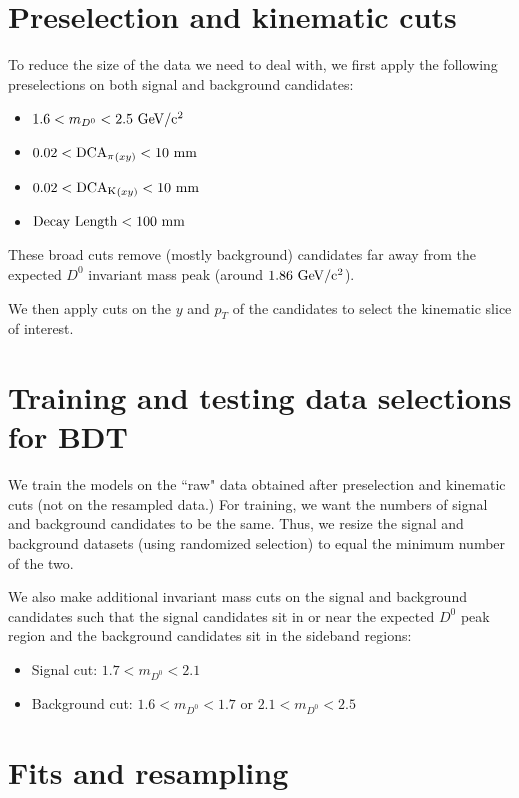 \section{Preselection and kinematic cuts}
\label{app.presel}
To reduce the size of the data we need to deal with, we first apply the following preselections on both signal and background candidates:
\begin{itemize}
    \item $1.6 < m_{D^0} < 2.5 ~{\rm GeV/c^2}$
    \item $0.02 < {\rm DCA_\pi}_{(xy)} < 10 ~{\rm mm}$
    \item $0.02 < {\rm DCA_K}_{(xy)} < 10 ~{\rm mm}$
    \item ${\rm Decay~Length} < 100 ~ {\rm mm}$
\end{itemize}
These broad cuts remove (mostly background) candidates far away from the expected $D^0$ invariant mass peak (around $1.86~{\rm GeV/c^2}$).

We then apply cuts on the $y$ and $p_T$ of the candidates to select the kinematic slice of interest.

\section{Training and testing data selections for BDT}
\label{app.presel}
We train the models on the ``raw" data obtained after preselection and kinematic cuts (not on the resampled data.) For training, we want the numbers of signal and background candidates to be the same. Thus, we resize the signal and background datasets (using randomized selection) to equal the minimum number of the two.

We also make additional invariant mass cuts on the signal and background candidates such that the signal candidates sit in or near the expected $D^0$ peak region and the background candidates sit in the sideband regions:
\begin{itemize}
    \item Signal cut: $1.7 < m_{D^0}<2.1$
    \item Background cut: $1.6 < m_{D^0}<1.7$ or $2.1 < m_{D^0}<2.5$
\end{itemize}

\section{Fits and resampling}
\label{app.resamp}

